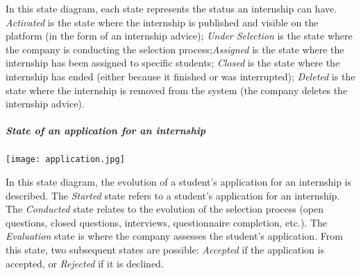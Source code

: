 					In this state diagram, each state represents the status an internship can have. \textit{Activated} is the state where the internship is published and visible on the platform (in the form of an internship advice); \textit{Under Selection} is the state where the company is conducting the selection process;\textit{Assigned} is the state where the internship has been assigned to specific students; \textit{Closed} is the state where the internship has ended (either because it finished or was interrupted); \textit{Deleted} is the state where the internship is removed from the system (the company deletes the internship advice).
					
				\subparagraph{State of an application for an internship}
					\begin{center}
						\texttt{[image: application.jpg]}
					\end{center}
					
					In this state diagram, the evolution of a student's application for an internship is described. The \textit{Started} state refers to a student's application for an internship. The \textit{Conducted} state relates to the evolution of the selection process (open questions, closed questions, interviews, questionnaire completion, etc.). The \textit{Evaluation} state is where the company assesses the student's application. From this state, two subsequent states are possible: \textit{Accepted} if the application is accepted, or \textit{Rejected} if it is declined.
					
